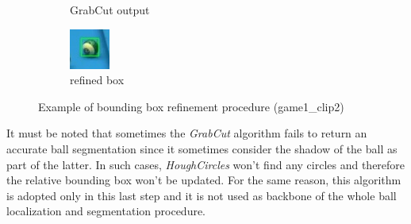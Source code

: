 \begin{figure}[h]
\begin{subfigure}[b]{0.25\textwidth}
        \caption{GrabCut output}
    \end{subfigure}
    \hspace{0.05\textwidth}
    \begin{subfigure}[b]{0.25\textwidth}
        \centering
        \includegraphics[width=\textwidth]{imgs/ball_localization/bbox_after.jpg}
        \caption{refined box}
    \end{subfigure}
    \caption{Example of bounding box refinement procedure (game1\_clip2)}
    \label{fig:refine}
\end{figure}
It must be noted that sometimes the \textit{GrabCut} algorithm fails to return an accurate ball segmentation since it sometimes consider the shadow of the ball as part of the latter.
In such cases, \textit{HoughCircles} won't find any circles and therefore the relative bounding box won't be updated.
For the same reason, this algorithm is adopted only in this last step and it is not used as backbone of the whole ball localization and segmentation procedure.